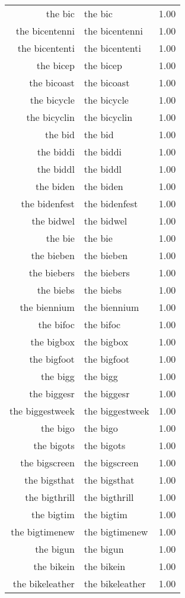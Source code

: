 \begin{table}[ht]
\begin{tabular}{rlr}
  the bic & the bic & 1.00 \\ 
  the bicentenni & the bicentenni & 1.00 \\ 
  the bicententi & the bicententi & 1.00 \\ 
  the bicep & the bicep & 1.00 \\ 
  the bicoast & the bicoast & 1.00 \\ 
  the bicycle & the bicycle & 1.00 \\ 
  the bicyclin & the bicyclin & 1.00 \\ 
  the bid & the bid & 1.00 \\ 
  the biddi & the biddi & 1.00 \\ 
  the biddl & the biddl & 1.00 \\ 
  the biden & the biden & 1.00 \\ 
  the bidenfest & the bidenfest & 1.00 \\ 
  the bidwel & the bidwel & 1.00 \\ 
  the bie & the bie & 1.00 \\ 
  the bieben & the bieben & 1.00 \\ 
  the biebers & the biebers & 1.00 \\ 
  the biebs & the biebs & 1.00 \\ 
  the biennium & the biennium & 1.00 \\ 
  the bifoc & the bifoc & 1.00 \\ 
  the bigbox & the bigbox & 1.00 \\ 
  the bigfoot & the bigfoot & 1.00 \\ 
  the bigg & the bigg & 1.00 \\ 
  the biggesr & the biggesr & 1.00 \\ 
  the biggestweek & the biggestweek & 1.00 \\ 
  the bigo & the bigo & 1.00 \\ 
  the bigots & the bigots & 1.00 \\ 
  the bigscreen & the bigscreen & 1.00 \\ 
  the bigsthat & the bigsthat & 1.00 \\ 
  the bigthrill & the bigthrill & 1.00 \\ 
  the bigtim & the bigtim & 1.00 \\ 
  the bigtimenew & the bigtimenew & 1.00 \\ 
  the bigun & the bigun & 1.00 \\ 
  the bikein & the bikein & 1.00 \\ 
  the bikeleather & the bikeleather & 1.00 \\ 

\end{tabular}
\end{table}
